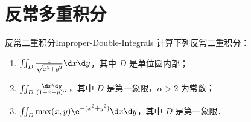 \section{反常多重积分}

\begin{problem}{反常二重积分}{Improper-Double-Integrals}
    计算下列反常二重积分：
    \begin{enumerate}
        \item $\iint_D \frac{1}{\sqrt{x^2 + y^2}} \d x \d y$，其中 $D$ 是单位圆内部；
        \item $\iint_D \frac{\d x \d y}{(1 + x + y)^\alpha}$，其中 $D$ 是第一象限，$\alpha > 2$ 为常数；
        \item $\iint_D \max(x, y) \e^{-(x^2 + y^2)} \d x \d y$，其中 $D$ 是第一象限．
    \end{enumerate}
\end{problem}

